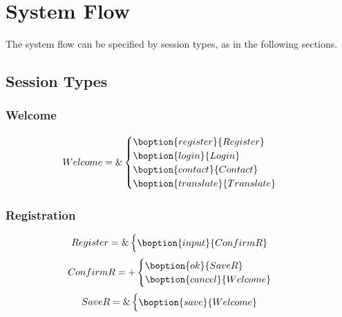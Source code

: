 \section{System Flow}
\label{sec:system-flow}

The system flow can be specified by session types, as in the following
sections.

\subsection{Session Types}
\label{sec:session-types}



\subsubsection{Welcome}
\label{sec:welcome}


\begin{align}
  Welcome &= \&
                \begin{cases}
                  \boption{register}{Register}\\
                  \boption{login}{Login}\\
                  \boption{contact}{Contact}\\
                  \boption{translate}{Translate}
                \end{cases}
\end{align}
%


\subsubsection{Registration}
\label{sec:registration}


\begin{align}
  Register &= \&
                 \begin{cases}
                   \boption{input}{ConfirmR}
                 \end{cases}
\end{align}
%
\begin{align}
  ConfirmR &= +
             \begin{cases}
               \boption{ok}{SaveR}\\
               \boption{cancel}{Welcome}
             \end{cases}
\end{align}
%
\begin{align}
  SaveR &= \&
              \begin{cases}
                \boption{save}{Welcome}
              \end{cases}
\end{align}
%

